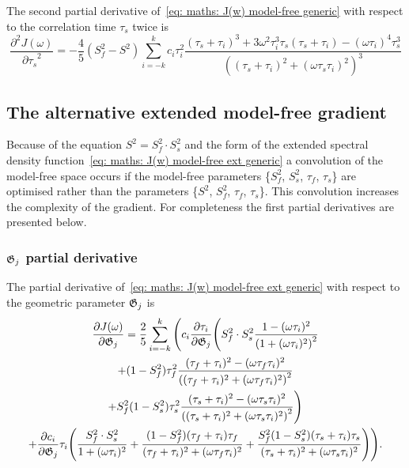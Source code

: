 The second partial derivative of~\eqref{eq: maths: J(w) model-free generic} with respect to the correlation time $\tau_s$ twice is
\begin{equation}
    \frac{\partial^2 J(\omega)}{{\partial \tau_s}^2} = -\frac{4}{5} (S^2_f - S^2) \sum_{i=-k}^k c_i \tau_i^2
        \frac{(\tau_s + \tau_i)^3  +  3 \omega^2 \tau_i^3 \tau_s (\tau_s + \tau_i)  -  (\omega \tau_i)^4 \tau_s^3}
            {\left((\tau_s + \tau_i)^2 + (\omega \tau_s \tau_i)^2 \right)^3}
\end{equation}





\newpage
\subsection{The alternative extended model-free gradient}

Because of the equation $S^2 = S^2_f \cdot S^2_s$ and the form of the extended spectral density function~\eqref{eq: maths: J(w) model-free ext generic} a convolution of the model-free space occurs if the model-free parameters \{$S^2_f$, $S^2_s$, $\tau_f$, $\tau_s$\} are optimised rather than the parameters \{$S^2$, $S^2_f$, $\tau_f$, $\tau_s$\}.  This convolution increases the complexity of the gradient.  For completeness the first partial derivatives are presented below.



\subsubsection{$\mathfrak{G}_j$ partial derivative}

The partial derivative of~\eqref{eq: maths: J(w) model-free ext generic} with respect to the geometric parameter $\mathfrak{G}_j$ is
\begin{multline}
    \frac{\partial J(\omega)}{\partial \mathfrak{G}_j} = \frac{2}{5} \sum_{i=-k}^k \Bigg(
        c_i \frac{\partial \tau_i}{\partial \mathfrak{G}_j} \Bigg(
            S^2_f \cdot S^2_s \frac{1 - (\omega \tau_i)^2}{\left(1 + (\omega \tau_i)^2 \right)^2} \\
            + (1 - S^2_f) \tau_f^2 \frac{(\tau_f + \tau_i)^2 - (\omega \tau_f \tau_i)^2}{\left((\tau_f + \tau_i)^2 + (\omega \tau_f \tau_i)^2 \right)^2} \\
            + S^2_f(1 - S^2_s) \tau_s^2 \frac{(\tau_s + \tau_i)^2 - (\omega \tau_s \tau_i)^2}{\left((\tau_s + \tau_i)^2 + (\omega \tau_s \tau_i)^2 \right)^2}
        \Bigg) \\
        +  \frac{\partial c_i}{\partial \mathfrak{G}_j} \tau_i \Bigg(
            \frac{S^2_f \cdot S^2_s}{1 + (\omega \tau_i)^2}
            + \frac{(1 - S^2_f)(\tau_f + \tau_i)\tau_f}{(\tau_f + \tau_i)^2 + (\omega \tau_f \tau_i)^2}
            + \frac{S^2_f(1 - S^2_s)(\tau_s + \tau_i)\tau_s}{(\tau_s + \tau_i)^2 + (\omega \tau_s \tau_i)^2}
        \Bigg)
    \Bigg).
\end{multline}



